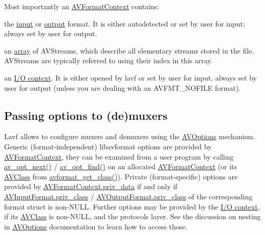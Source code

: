 Most importantly an \hyperlink{struct_a_v_format_context}{A\+V\+Format\+Context} contains\+: \begin{DoxyItemize}
\item the \hyperlink{struct_a_v_format_context_a78efc5a53c21c8d81197445207ac4374}{input} or \hyperlink{struct_a_v_format_context_a20d80ac07e38ff5c268d15aaf2798b98}{output} format. It is either autodetected or set by user for input; always set by user for output. \item an \hyperlink{struct_a_v_format_context_acfefb6b6cf21e87a0dcbd1a547ba2348}{array} of A\+V\+Streams, which describe all elementary streams stored in the file. A\+V\+Streams are typically referred to using their index in this array. \item an \hyperlink{struct_a_v_format_context_a1e7324262b6b78522e52064daaa7bc87}{I/O context}. It is either opened by lavf or set by user for input, always set by user for output (unless you are dealing with an A\+V\+F\+M\+T\+\_\+\+N\+O\+F\+I\+LE format).\end{DoxyItemize}
\hypertarget{group__libavf_lavf_options}{}\subsection{Passing options to (de)muxers}\label{group__libavf_lavf_options}
Lavf allows to configure muxers and demuxers using the \hyperlink{group__avoptions}{A\+V\+Options} mechanism. Generic (format-\/independent) libavformat options are provided by \hyperlink{struct_a_v_format_context}{A\+V\+Format\+Context}, they can be examined from a user program by calling \hyperlink{group__avoptions_ga78edbb7da1fdc8626d8a52f8ab7e7a0c}{av\+\_\+opt\+\_\+next()} / \hyperlink{group__avoptions_gae31ae7fb20113b00108d0ecf53f25664}{av\+\_\+opt\+\_\+find()} on an allocated \hyperlink{struct_a_v_format_context}{A\+V\+Format\+Context} (or its \hyperlink{struct_a_v_class}{A\+V\+Class} from \hyperlink{group__lavf__core_ga6030789ce395ef543306bbe933619749}{avformat\+\_\+get\+\_\+class()}). Private (format-\/specific) options are provided by \hyperlink{struct_a_v_format_context_ac4c0777e54085af2f3f1b27130e2b21b}{A\+V\+Format\+Context.\+priv\+\_\+data} if and only if \hyperlink{struct_a_v_input_format_afaac829559ad9e07618c01a51d8a4c5f}{A\+V\+Input\+Format.\+priv\+\_\+class} / \hyperlink{struct_a_v_output_format_ae030463c5c08de99f8c9e727c822ca87}{A\+V\+Output\+Format.\+priv\+\_\+class} of the corresponding format struct is non-\/\+N\+U\+LL. Further options may be provided by the \hyperlink{struct_a_v_format_context_a1e7324262b6b78522e52064daaa7bc87}{I/O context}, if its \hyperlink{struct_a_v_class}{A\+V\+Class} is non-\/\+N\+U\+LL, and the protocols layer. See the discussion on nesting in \hyperlink{group__avoptions}{A\+V\+Options} documentation to learn how to access those. 